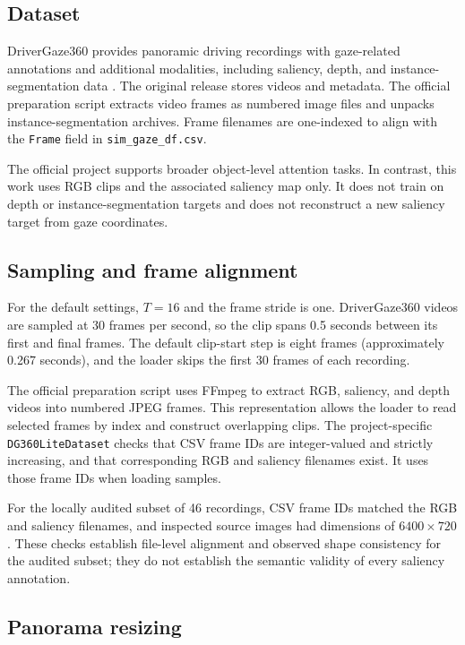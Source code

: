 \documentclass[10pt,twocolumn,letterpaper]{article}
\begin{document}
\subsection{Dataset}

DriverGaze360 provides panoramic driving recordings with gaze-related
annotations and additional modalities, including saliency, depth, and
instance-segmentation data \cite{govil2026drivergaze360}. The original release
stores videos and metadata. The official preparation script extracts video
frames as numbered image files and unpacks instance-segmentation archives.
Frame filenames are one-indexed to align with the \texttt{Frame} field in
\texttt{sim\_gaze\_df.csv}.

The official project supports broader object-level attention tasks. In
contrast, this work uses RGB clips and the associated saliency map only. It
does not train on depth or instance-segmentation targets and does not
reconstruct a new saliency target from gaze coordinates.

\subsection{Sampling and frame alignment}

For the default settings, \(T=16\) and the frame stride is one. DriverGaze360
videos are sampled at 30 frames per second, so the clip spans 0.5 seconds
between its first and final frames. The default clip-start step is eight
frames (approximately 0.267 seconds), and the loader skips the first 30
frames of each recording.

The official preparation script uses FFmpeg to extract RGB, saliency, and
depth videos into numbered JPEG frames. This representation allows the
loader to read selected frames by index and construct overlapping clips.
The project-specific \texttt{DG360LiteDataset} checks that CSV frame IDs are
integer-valued and strictly increasing, and that corresponding RGB and
saliency filenames exist. It uses those frame IDs when loading samples.

For the locally audited subset of 46 recordings, CSV frame IDs matched the
RGB and saliency filenames, and inspected source images had dimensions of
\(6400 \times 720\). These checks establish file-level alignment and observed
shape consistency for the audited subset; they do not establish the semantic
validity of every saliency annotation.

\subsection{Panorama resizing}
\end{document}
